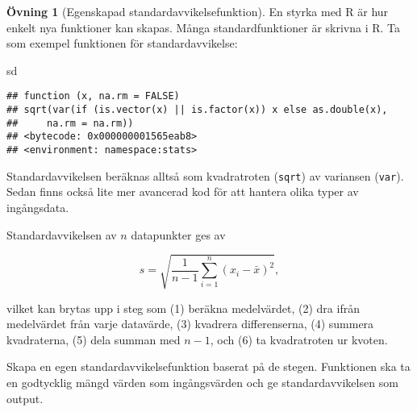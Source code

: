\documentclass[
]{book}
\newenvironment{Shaded}{\begin{snugshade}}{\end{snugshade}}
\newcommand{\NormalTok}[1]{#1}
\theoremstyle{definition}
\theoremstyle{definition}
\theoremstyle{definition}
\newtheorem{exercise}{Övning}[chapter]
\theoremstyle{definition}
\theoremstyle{remark}
\begin{document}
\begin{exercise}[Egenskapad standardavvikelsefunktion]
En styrka med R är hur enkelt nya funktioner kan skapas. Många standardfunktioner är skrivna i R. Ta som exempel funktionen för standardavvikelse:

\begin{Shaded}
\begin{Highlighting}[]
\NormalTok{sd}
\end{Highlighting}
\end{Shaded}

\begin{verbatim}
## function (x, na.rm = FALSE) 
## sqrt(var(if (is.vector(x) || is.factor(x)) x else as.double(x), 
##     na.rm = na.rm))
## <bytecode: 0x000000001565eab8>
## <environment: namespace:stats>
\end{verbatim}

Standardavvikelsen beräknas alltså som kvadratroten (\texttt{sqrt}) av variansen (\texttt{var}). Sedan finns också lite mer avancerad kod för att hantera olika typer av ingångsdata.

Standardavvikelsen av \(n\) datapunkter ges av

\[s = \sqrt{\frac{1}{n-1}\sum_{i=1}^n (x_i - \bar x)^2},\]

vilket kan brytas upp i steg som (1) beräkna medelvärdet, (2) dra ifrån medelvärdet från varje datavärde, (3) kvadrera differenserna, (4) summera kvadraterna, (5) dela summan med \(n-1\), och (6) ta kvadratroten ur kvoten.

Skapa en egen standardavvikelsefunktion baserat på de stegen. Funktionen ska ta en godtycklig mängd värden som ingångsvärden och ge standardavvikelsen som output.
\end{exercise}
\end{document}
